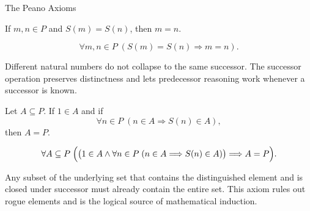\begin{topicbox}{The Peano Axioms}
\NoLocalDependencies

\begin{tcolorbox}[colback=axiombox, colframe=axiomborder, arc=2pt,
  left=6pt, right=6pt, top=4pt, bottom=4pt,
  title={\small\textbf{Axiom (Injectivity of Successor)}},
  fonttitle=\small\bfseries]
\begin{axiom}
\label{ax:peano-successor-injective}
If $m,n \in P$ and $S(m)=S(n)$, then $m=n$.
\end{axiom}
\end{tcolorbox}

\begin{remark*}
\[
\forall m,n \in P\;(S(m)=S(n) \Longrightarrow m=n).
\]
\end{remark*}

\begin{remark*}[Interpretation]
Different natural numbers do not collapse to the same successor. The successor
operation preserves distinctness and lets predecessor reasoning work whenever a
successor is known.
\end{remark*}

\NoLocalDependencies

\begin{tcolorbox}[colback=axiombox, colframe=axiomborder, arc=2pt,
  left=6pt, right=6pt, top=4pt, bottom=4pt,
  title={\small\textbf{Axiom (Induction Axiom)}},
  fonttitle=\small\bfseries]
\begin{axiom}
\label{ax:peano-induction}
Let $A \subseteq P$. If $1 \in A$ and if
\[
\forall n \in P\;(n \in A \Longrightarrow S(n) \in A),
\]
then $A=P$.
\end{axiom}
\end{tcolorbox}

\begin{remark*}
\[
\forall A \subseteq P\;
\Bigl(\bigl(1 \in A \land
\forall n \in P\;(n \in A \Longrightarrow S(n) \in A)\bigr)
\Longrightarrow A=P\Bigr).
\]
\end{remark*}

\begin{remark*}[Interpretation]
Any subset of the underlying set that contains the distinguished element and is
closed under successor must already contain the entire set. This axiom rules
out rogue elements and is the logical source of mathematical induction.
\end{remark*}

\NoLocalDependencies


\end{topicbox}
